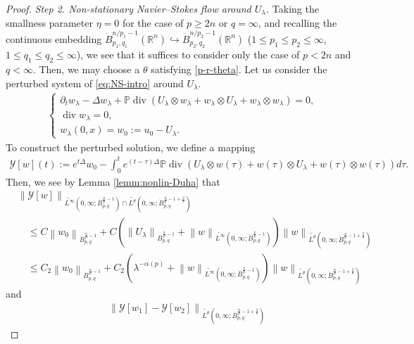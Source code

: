 \documentclass[a4paper,12pt,reqno]{amsart}
\theoremstyle{plain}
\theoremstyle{definition}
\renewcommand{\div}{\operatorname{div}}
\newcommand{\dB}{\dot{B}}
\renewcommand{\leq}{\leqslant}
\renewcommand{\geq}{\geqslant}
\newcommand{\n}[1]{{\left\|#1\right\|}}
\newcommand{\R}{\mathbb{R}}
\renewcommand{\sp}[1]{\left(#1\right)}
\begin{document}
\begin{proof}
\noindent
{\it Step 2. Non-stationary Navier--Stokes flow around $U_{\lambda}$.}
%
Taking the smallness parameter $\eta=0$ for the case of $p \geq 2n$ or $q=\infty$,
and recalling the continuous embedding $\dB_{p_1,q_1}^{n/p_1-1}(\R^n) \hookrightarrow \dB_{p_2,q_2}^{n/p_2-1}(\R^n)$ ($1 \leq p_1 \leq p_2 \leq \infty$, $1 \leq q_1 \leq q_2 \leq \infty$),
we see that it suffices to consider only the case of $p<2n$ and $q<\infty$.
Then, we may choose a $\theta$ satisfying \eqref{p-r-theta}.
Let us consider the perturbed system of \eqref{eq:NS-intro} around $U_{\lambda}$.
\begin{align}\label{eq:w}
    \begin{cases}
        \partial_t w_{\lambda} - \Delta w_{\lambda} + \mathbb{P}\div (U_{\lambda} \otimes w_{\lambda} + w_{\lambda} \otimes U_{\lambda} + w_{\lambda} \otimes w_{\lambda}) = 0, \\
        \div w_{\lambda} = 0,\\
        w_{\lambda}(0,x)=w_0:=u_0-U_{\lambda}.
    \end{cases}
\end{align}
To construct the perturbed solution, we define a mapping 
\begin{align}
    \mathcal{Y}[w](t)
    :=
    e^{t\Delta}w_0
    -\int_0^t e^{(t-\tau)\Delta}\mathbb{P}\div\sp{U_{\lambda} \otimes w(\tau) + w(\tau) \otimes U_{\lambda} + w(\tau) \otimes w(\tau)}d\tau.
\end{align}
Then, we see by Lemma \ref{lemm:nonlin-Duha} that 
\begin{align}
    &
    \n{\mathcal{Y}[w]}_{\widetilde{L^{\infty}}(0,\infty;\dB_{p,q}^{\frac{n}{p}-1})\cap\widetilde{L^{\theta}}(0,\infty;\dB_{p,q}^{\frac{n}{p}-1+\frac{2}{\theta}})}
    \\
    &\quad
    \leq{}
    C
    \n{w_0}_{\dB_{p,q}^{\frac{n}{p}-1}}
    +
    C
    \sp{
    \n{U_{\lambda}}_{\dB_{p,q}^{\frac{n}{p}-1}}
    +
    \n{w}_{\widetilde{L^{\infty}}(0,\infty;\dB_{p,q}^{\frac{n}{p}-1})}
    }
    \n{w}_{\widetilde{L^{\theta}}(0,\infty;\dB_{p,q}^{\frac{n}{p}-1+\frac{2}{\theta}})}
    \\
    &\quad
    \leq{}
    C_2
    \n{w_0}_{\dB_{p,q}^{\frac{n}{p}-1}}
    +
    C_2
    \sp{
    \lambda^{-\alpha(p)}
    +
    \n{w}_{\widetilde{L^{\infty}}(0,\infty;\dB_{p,q}^{\frac{n}{p}-1})}
    }
    \n{w}_{\widetilde{L^{\theta}}(0,\infty;\dB_{p,q}^{\frac{n}{p}-1+\frac{2}{\theta}})}
\end{align}
and
\begin{align}
    &
    \n{\mathcal{Y}[w_1]-\mathcal{Y}[w_2]}_{\widetilde{L^{\theta}}(0,\infty;\dB_{p,q}^{\frac{n}{p}-1+\frac{2}{\theta}})}

\end{align}
\end{proof}
\end{document}
